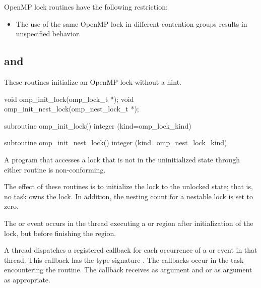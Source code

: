 \restrictions
OpenMP lock routines have the following restriction:

\begin{itemize}
\item The use of the same OpenMP lock in different contention groups 
      results in unspecified behavior.
\end{itemize}



\subsection{ and }
\label{subsec:omp_init_lock and omp_init_nest_lock}
\summary
These routines initialize an OpenMP lock without a hint.

\format
\begin{ccppspecific}
\begin{ompcFunction}
void omp_init_lock(omp_lock_t *);
void omp_init_nest_lock(omp_nest_lock_t *);
\end{ompcFunction}
\end{ccppspecific}

\begin{fortranspecific}
\begin{ompfSubroutine}
subroutine omp_init_lock()
integer (kind=omp_lock_kind) 

subroutine omp_init_nest_lock()
integer (kind=omp_nest_lock_kind) 
\end{ompfSubroutine}
\end{fortranspecific}

\constraints
A program that accesses a lock that is not in the uninitialized state through either routine
is non-conforming.

\effect
The effect of these routines is to initialize the lock to the unlocked state; that is, no task
owns the lock. In addition, the nesting count for a nestable lock is set to zero.

\events

The  or  event occurs in the thread
executing a  or  region
after initialization of the lock, but before finishing the region.

\tools

A thread dispatches a registered 
callback for each occurrence of a  or  event
in that thread.  This callback has the type signature .
The callbacks occur in the task encountering the routine.
The callback receives  as
 argument and
 or
  as  argument as appropriate.

